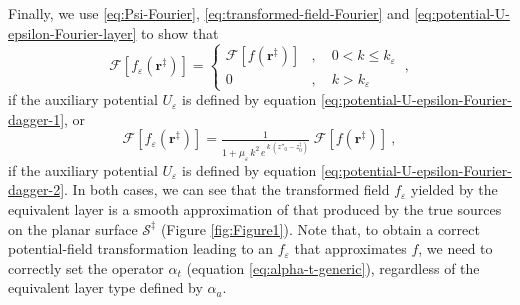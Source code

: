 Finally, we use \ref{eq:Psi-Fourier}, \ref{eq:transformed-field-Fourier} and \ref{eq:potential-U-epsilon-Fourier-layer} to show that
\begin{equation}
	\mathcal{F} [ f_{\varepsilon}(\mathbf{r}^{\ddagger}) ] = 
	\begin{cases}
		\mathcal{F} [ f(\mathbf{r}^{\ddagger}) ] &
		, \quad 0 < k \le k_{\varepsilon} \\
		0 & , \quad k > k_{\varepsilon} 
	\end{cases} \: ,
	\label{eq:transformed-field-continuous-layer-1-Fourier}
\end{equation}
if the auxiliary potential $U_{\varepsilon}$ is defined by equation \ref{eq:potential-U-epsilon-Fourier-dagger-1},
or
\begin{equation}
	\mathcal{F} [ f_{\varepsilon}(\mathbf{r}^{\ddagger}) ] = 
	\tfrac{1}{1 + \mu_{\varepsilon} \, k^{2} \, e^{\, k \, (z''_{0} - z^{\ddagger}_{0})}} \; 
	\mathcal{F} [ f(\mathbf{r}^{\ddagger}) ] \: ,
	\label{eq:transformed-field-continuous-layer-2-Fourier}
\end{equation}
if the auxiliary potential $U_{\varepsilon}$ is defined by equation \ref{eq:potential-U-epsilon-Fourier-dagger-2}.
In both cases, we can see that the transformed field $f_{\varepsilon}$ yielded by the equivalent layer 
is a smooth approximation of that produced by the true sources on the planar surface $\mathcal{S}^{\ddagger}$
(Figure \ref{fig:Figure1}). Note that, to obtain a correct potential-field transformation leading to an $f_{\varepsilon}$ 
that approximates $f$, we need to correctly set the operator $\alpha_{t}$ (equation \ref{eq:alpha-t-generic}), 
regardless of the equivalent layer type defined by $\alpha_{a}$.


